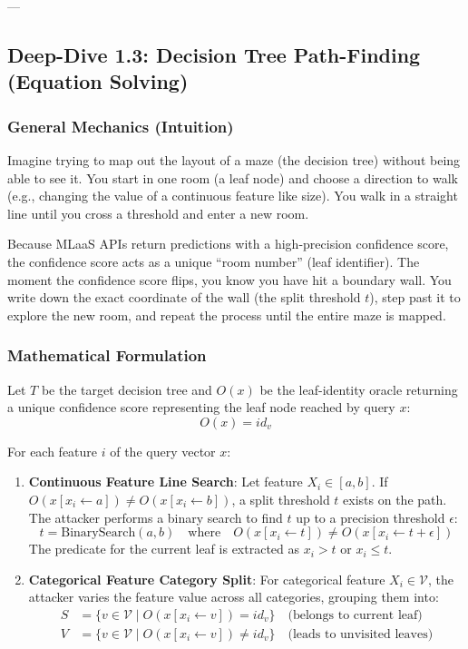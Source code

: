 \documentclass{article}
\begin{document}
---

\subsection{Deep-Dive 1.3: Decision Tree Path-Finding (Equation Solving)}

\subsubsection{General Mechanics (Intuition)}
Imagine trying to map out the layout of a maze (the decision tree) without being able to see it. You start in one room (a leaf node) and choose a direction to walk (e.g., changing the value of a continuous feature like size). You walk in a straight line until you cross a threshold and enter a new room. 

Because MLaaS APIs return predictions with a high-precision confidence score, the confidence score acts as a unique ``room number'' (leaf identifier). The moment the confidence score flips, you know you have hit a boundary wall. You write down the exact coordinate of the wall (the split threshold $t$), step past it to explore the new room, and repeat the process until the entire maze is mapped.

\subsubsection{Mathematical Formulation}
Let $T$ be the target decision tree and $O(x)$ be the leaf-identity oracle returning a unique confidence score representing the leaf node reached by query $x$:
\begin{equation}
    O(x) = id_v
\end{equation}

For each feature $i$ of the query vector $x$:
\begin{enumerate}
    \item \textbf{Continuous Feature Line Search}: 
    Let feature $X_i \in [a, b]$. If $O(x[x_i \leftarrow a]) \neq O(x[x_i \leftarrow b])$, a split threshold $t$ exists on the path. The attacker performs a binary search to find $t$ up to a precision threshold $\epsilon$:
    \begin{equation}
        t = \text{BinarySearch}(a, b) \quad \text{where} \quad O(x[x_i \leftarrow t]) \neq O(x[x_i \leftarrow t + \epsilon])
    \end{equation}
    The predicate for the current leaf is extracted as $x_i > t$ or $x_i \le t$.
    
    \item \textbf{Categorical Feature Category Split}:
    For categorical feature $X_i \in \mathcal{V}$, the attacker varies the feature value across all categories, grouping them into:
    \begin{align}
        S &= \{ v \in \mathcal{V} \mid O(x[x_i \leftarrow v]) = id_v \} \quad \text{(belongs to current leaf)} \\
        V &= \{ v \in \mathcal{V} \mid O(x[x_i \leftarrow v]) \neq id_v \} \quad \text{(leads to unvisited leaves)}
    \end{align}
\end{enumerate}
\end{document}

